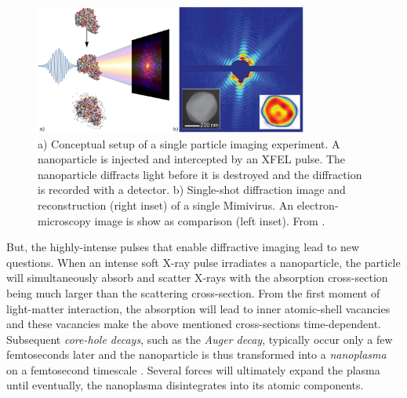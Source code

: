 \begin{figure}
	\centering
		\includegraphics[width=0.80\textwidth]{images/intro-dani.jpg}
	\caption[Conceptual setup of a single particle imaging experiment.]{a) Conceptual setup of a single particle imaging experiment. A nanoparticle is injected and intercepted by an XFEL pulse. The nanoparticle diffracts light before it is destroyed and the diffraction is recorded with a detector. b) Single-shot diffraction image and reconstruction (right inset) of a single Mimivirus. An electron-microscopy image is show as comparison  (left inset). From \cite[\href{http://creativecommons.org/licenses/by-nc-nd/3.0/de/}{\ccbyncndeu}]{Rupp-2013-Thesis,Neutze-2000-Nature,Seibert-2011-Nature}.}
	\label{fig:spi-concept}
\end{figure}
%
But, the highly-intense pulses that enable diffractive imaging lead to new questions. When an intense soft X-ray pulse irradiates a nanoparticle, the particle will simultaneously absorb and scatter X-rays with the absorption cross-section being much larger than the scattering cross-section. From the first moment of light-matter interaction, the absorption will lead to inner atomic-shell vacancies \citep{Young-2010-Nature} and these vacancies make the above mentioned cross-sections time-dependent. Subsequent \textit{core-hole decays}, such as the \textit{Auger decay}, typically occur only a few femtoseconds later and the nanoparticle is thus transformed into a \textit{nanoplasma} on a femtosecond timescale \cite{Bostedt-2012-PRL}. Several forces will ultimately expand the plasma \citep{Gorkhover-2016-NatPho,Ferguson-2016-SciAdv} until eventually, the nanoplasma disintegrates into its atomic components.\\[1\baselineskip]
%
